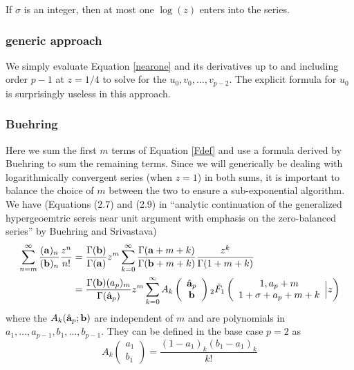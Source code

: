 \documentclass[10pt]{article}
\numberwithin{equation}{section}
\begin{document}
If $\sigma$ is an integer, then at most one $\log(z)$ enters into the series.
\subsubsection{generic approach}
We simply evaluate Equation \eqref{nearone} and its derivatives up to and including order $p-1$ at $z=1/4$ to solve for the $u_0,v_0,\dots,v_{p-2}$. The explicit formula for $u_0$ is surprisingly useless in this approach.

\subsubsection{Buehring}
Here we sum the first $m$ terms of Equation \eqref{Fdef} and use a formula derived by Buehring to sum the remaining terms. Since we will generically be dealing with logarithmically convergent series (when $z=1$) in both sums, it is important to balance the choice of $m$ between the two to ensure a sub-exponential algorithm.
We have (Equations (2.7) and (2.9) in ``analytic continuation of the generalized hypergeoemtric sereis near unit argument with emphasis on the zero-balanced series'' by Buehring and Srivastava)
\begin{align}
\nonumber
\sum_{n=m}^{\infty}{\frac{(\bold{a})_n}{(\bold{b})_n} \frac{z^n}{n!}}&=\frac{\Gamma(\bold{b})}{\Gamma(\bold{a})} z^m \sum_{k=0}^{\infty} {\frac{\Gamma(\bold{a}+m+k)}{\Gamma(\bold{b}+m+k)} \frac{z^k}{\Gamma(1+m+k)}}\\
\label{buehring}
&=\frac{\Gamma(\bold{b})(a_p)_m}{\Gamma(\hat{\bold{a}}_p)} z^m \sum_{k=0}^{\infty} {A_k\left(\begin{array}{c} \hat{\bold{a}}_p \\ \bold{b} \end{array}\right)} \,{} _2\tilde{F}_1\left( \begin{array}{c} 1,a_p+m \\ 1+\sigma+a_p+m+k \end{array} \Big| z\right)
\end{align}
where the $A_k(\hat{\bold{a}}_p; \bold{b})$ are independent of $m$ and are polynomials in $a_1,\dots,a_{p-1},b_1,\dots,b_{p-1}$. They can be defined in the base case $p=2$ as
\begin{equation*}
A_k\left(\begin{array}{c} a_1 \\ b_1 \end{array}\right) = \frac{(1-a_1)_k(b_1-a_1)_k}{k!}
\end{equation*}
\end{document}
